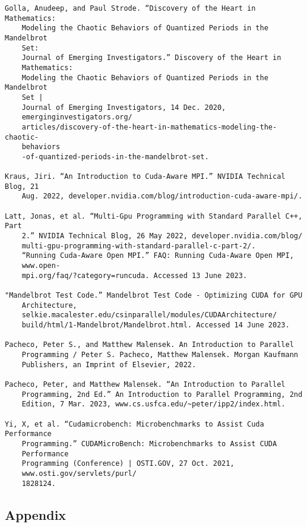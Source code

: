 \documentclass{article}
\begin{document}
\begin{verbatim}
Golla, Anudeep, and Paul Strode. “Discovery of the Heart in Mathematics: 
    Modeling the Chaotic Behaviors of Quantized Periods in the Mandelbrot
    Set: 
    Journal of Emerging Investigators.” Discovery of the Heart in 
    Mathematics:
    Modeling the Chaotic Behaviors of Quantized Periods in the Mandelbrot
    Set | 
    Journal of Emerging Investigators, 14 Dec. 2020, 
    emerginginvestigators.org/
    articles/discovery-of-the-heart-in-mathematics-modeling-the-chaotic-
    behaviors
    -of-quantized-periods-in-the-mandelbrot-set. 
    
Kraus, Jiri. “An Introduction to Cuda-Aware MPI.” NVIDIA Technical Blog, 21 
    Aug. 2022, developer.nvidia.com/blog/introduction-cuda-aware-mpi/. 
    
Latt, Jonas, et al. “Multi-Gpu Programming with Standard Parallel C++, Part 
    2.” NVIDIA Technical Blog, 26 May 2022, developer.nvidia.com/blog/
    multi-gpu-programming-with-standard-parallel-c-part-2/. 
    “Running Cuda-Aware Open MPI.” FAQ: Running Cuda-Aware Open MPI, 
    www.open-
    mpi.org/faq/?category=runcuda. Accessed 13 June 2023. 

"Mandelbrot Test Code.” Mandelbrot Test Code - Optimizing CUDA for GPU 
    Architecture, 
    selkie.macalester.edu/csinparallel/modules/CUDAArchitecture/
    build/html/1-Mandelbrot/Mandelbrot.html. Accessed 14 June 2023. 

Pacheco, Peter S., and Matthew Malensek. An Introduction to Parallel 
    Programming / Peter S. Pacheco, Matthew Malensek. Morgan Kaufmann 
    Publishers, an Imprint of Elsevier, 2022. 

Pacheco, Peter, and Matthew Malensek. “An Introduction to Parallel  
    Programming, 2nd Ed.” An Introduction to Parallel Programming, 2nd 
    Edition, 7 Mar. 2023, www.cs.usfca.edu/~peter/ipp2/index.html. 

Yi, X, et al. “Cudamicrobench: Microbenchmarks to Assist Cuda Performance
    Programming.” CUDAMicroBench: Microbenchmarks to Assist CUDA 
    Performance 
    Programming (Conference) | OSTI.GOV, 27 Oct. 2021, 
    www.osti.gov/servlets/purl/
    1828124. 
\end{verbatim}

\pagebreak

\begin{center}

\section*{Appendix}

\end{center}
\end{document}
